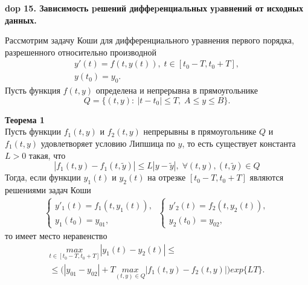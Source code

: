 \textbf{\LARGE dop 15. Зависимость pешений диффеpенциальных уpавнений от исходных данных.}

Рассмотрим задачу Коши для дифференциального уравнения первого порядка, разрешенного относительно производной
\begin{equation*}
\begin{split}
y'(t)=f(t,y(t)), \; t\in [t_0-T,t_0+T],\\
y(t_0)=y_0.
\end{split}
\end{equation*}
Пусть функция $f(t,y)$ определена и непрерывна в прямоугольнике
\begin{equation*}
Q=\{(t,y):\: |t-t_0|\leq T,\; A\leq y\leq B\}.
\end{equation*}

\textbf{Теорема 1}\\
Пусть функции $f_1 (t,y)$ и $f_2 (t,y)$ непрерывны в прямоугольнике $Q$ и $f_1 (t,y)$ удовлетворяет условию Липшица по $y$, то есть существует константа  $L > 0$ такая, что
\begin{equation*}
|f_1(t,y)-f_1(t,\widetilde{y})|\leq L|y-\widetilde{y}|,\; \forall(t,y), (t,\widetilde{y})\in Q
\end{equation*}
Тогда, если функции $y_1(t)$ и $y_2(t)$ на отрезке $[t_0-T,t_0+T]$ являются решениями задач Коши 
\begin{equation*}
\begin{split}
\begin{cases}
y'_1(t)=f_1(t,y_1(t)),\\
y_1(t_0)=y_{01},
\end{cases}
\:
\begin{cases}
y'_2(t)=f_2(t,y_2(t)),\\
y_2(t_0)=y_{02},
\end{cases}
\end{split}
\end{equation*}
то имеет место неравенство 
\begin{equation*}\tag{1}
\begin{split}
\underset{t\in[t_0-T,t_0+T]}{max} |y_1(t)-y_2(t)|\leq \\
\leq \big( |y_{01}-y_{02}|+T \underset{(t,y)\in Q}{max} |f_1(t,y)-f_2(t,y)|\big) exp\{LT\}.
\end{split}
\end{equation*}

